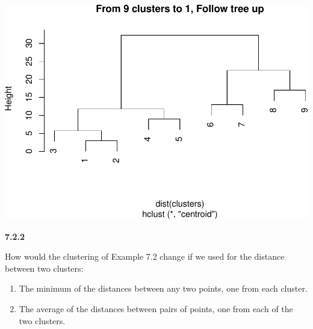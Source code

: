 \documentclass[]{article}
\begin{document}
\includegraphics{arancibia_week8_hw_files/figure-latex/unnamed-chunk-1-1.pdf}

\textbf{7.2.2}

How would the clustering of Example 7.2 change if we used for the
distance between two clusters:

\begin{enumerate}
\def\labelenumi{(\alph{enumi})}
\item
  The minimum of the distances between any two points, one from each
  cluster.
\item
  The average of the distances between pairs of points, one from each of
  the two clusters.
\end{enumerate}
\end{document}
